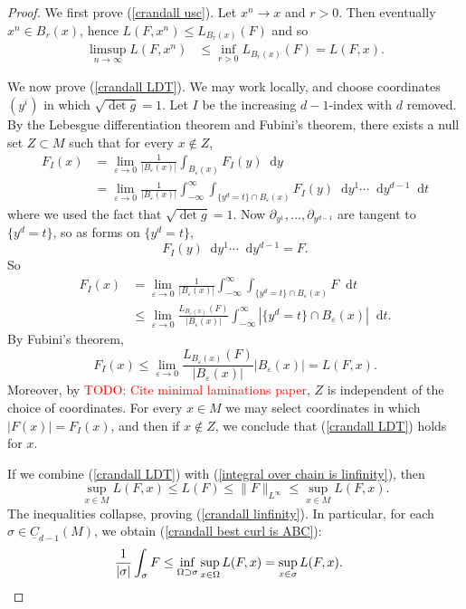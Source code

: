 \documentclass[reqno,11pt]{amsart}
\newcommand*\dif{\mathop{}\!\mathrm{d}}
\newcommand{\Chain}{\underline C}
\theoremstyle{definition}
\numberwithin{equation}{section}
\newcommand\todo[1]{\textcolor{red}{TODO: #1}}
\begin{document}
\begin{proof}
We first prove (\ref{crandall usc}).
Let $x^n \to x$ and $r > 0$. Then eventually $x^n \in B_r(x)$, hence $L(F, x^n) \leq L_{B_r(x)}(F)$ and so
\begin{align*}
\limsup_{n \to \infty} L(F, x^n) &\leq \inf_{r > 0} L_{B_r(x)}(F) = L(F, x).
\end{align*}

We now prove (\ref{crandall LDT}).
We may work locally, and choose coordinates $(y^i)$ in which $\sqrt{\det g} = 1$.
Let $I$ be the increasing $d-1$-index with $d$ removed.
By the Lebesgue differentiation theorem and Fubini's theorem, there exists a null set $Z \subset M$ such that for every $x \notin Z$,
\begin{align*}
F_I(x) 
&= \lim_{\varepsilon \to 0} \frac{1}{|B_\varepsilon(x)|} \int_{B_\varepsilon(x)} F_I(y) \dif y \\
&= \lim_{\varepsilon \to 0} \frac{1}{|B_\varepsilon(x)|} \int_{-\infty}^\infty \int_{\{y^d = t\} \cap B_\varepsilon(x)} F_I(y) \dif y^1 \cdots \dif y^{d - 1} \dif t
\end{align*}
where we used the fact that $\sqrt{\det g} = 1$.
Now $\partial_{y^1}, \dots, \partial_{y^{d - 1}}$ are tangent to $\{y^d = t\}$, so as forms on $\{y^d = t\}$,
$$F_I(y) \dif y^1 \cdots \dif y^{d - 1} = F.$$
So
\begin{align*}
F_I(x) 
&= \lim_{\varepsilon \to 0} \frac{1}{|B_\varepsilon(x)|} \int_{-\infty}^\infty \int_{\{y^d = t\} \cap B_\varepsilon(x)} F \dif t \\
&\leq \lim_{\varepsilon \to 0} \frac{L_{B_\varepsilon(x)}(F)}{|B_\varepsilon(x)|} \int_{-\infty}^\infty |\{y^d = t\} \cap B_\varepsilon(x)| \dif t.
\end{align*}
By Fubini's theorem,
$$F_I(x) \leq \lim_{\varepsilon \to 0} \frac{L_{B_\varepsilon(x)}(F)}{|B_\varepsilon(x)|} |B_\varepsilon(x)| = L(F, x).$$
Moreover, by \todo{Cite minimal laminations paper}, $Z$ is independent of the choice of coordinates.
For every $x \in M$ we may select coordinates in which $|F(x)| = F_I(x)$, and then if $x \notin Z$, we conclude that (\ref{crandall LDT}) holds for $x$.

If we combine (\ref{crandall LDT}) with (\ref{integral over chain is linfinity}), then
$$\sup_{x \in M} L(F, x) \leq L(F) \leq \|F\|_{L^\infty} \leq \sup_{x \in M} L(F, x).$$
The inequalities collapse, proving (\ref{crandall linfinity}).
In particular, for each $\sigma \in \Chain_{d - 1}(M)$, we obtain (\ref{crandall best curl is ABC}):
\begin{align*}
\frac{1}{|\sigma|} \int_\sigma F &\leq \inf_{\Omega \supset \sigma} \sup_{x \in \Omega} L(F, x) = \sup_{x \in \sigma} L(F, x). \qedhere
\end{align*}
\end{proof}
\end{document}
